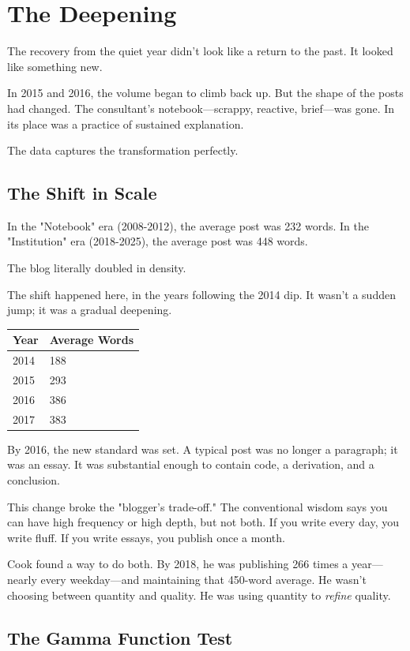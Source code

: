 \chapter{The Deepening}

The recovery from the quiet year didn't look like a return to the past. It looked like something new.

In 2015 and 2016, the volume began to climb back up. But the shape of the posts had changed. The consultant's notebook---scrappy, reactive, brief---was gone. In its place was a practice of sustained explanation.

The data captures the transformation perfectly.

\bigskip

\section*{The Shift in Scale}

In the "Notebook" era (2008-2012), the average post was 232 words.
In the "Institution" era (2018-2025), the average post was 448 words.

The blog literally doubled in density.

The shift happened here, in the years following the 2014 dip. It wasn't a sudden jump; it was a gradual deepening.

\begin{longtable}{l p{6.5cm}}
\toprule
\textbf{Year} & \textbf{Average Words} \tabularnewline
\midrule
2014 & 188 \tabularnewline
2015 & 293 \tabularnewline
2016 & 386 \tabularnewline
2017 & 383 \tabularnewline
\bottomrule
\end{longtable}

By 2016, the new standard was set. A typical post was no longer a paragraph; it was an essay. It was substantial enough to contain code, a derivation, and a conclusion.

This change broke the "blogger's trade-off." The conventional wisdom says you can have high frequency or high depth, but not both. If you write every day, you write fluff. If you write essays, you publish once a month.

Cook found a way to do both. By 2018, he was publishing 266 times a year---nearly every weekday---and maintaining that 450-word average. He wasn't choosing between quantity and quality. He was using quantity to \textit{refine} quality.

\bigskip

\section*{The Gamma Function Test}

